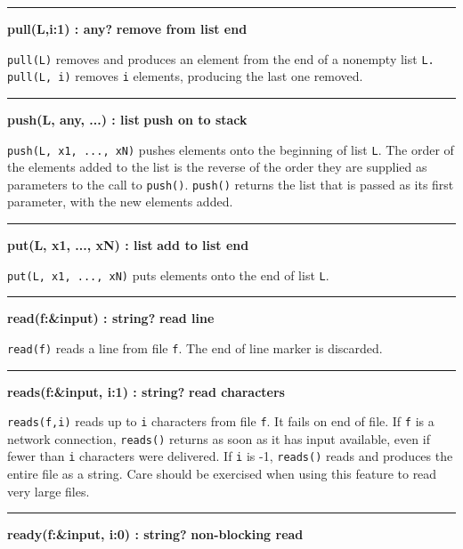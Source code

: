 \bigskip\hrule\vspace{0.1cm}
\noindent
{\bf pull(L,i:1) : any? } \hfill {\bf remove from list end}\WarningNotThreadSafe

\noindent
{}\texttt{pull(L)} removes and produces an element from the
end of a nonempty list \texttt{L.} \texttt{pull(L, i)} removes
\texttt{i} elements, producing the last one removed.

\bigskip\hrule\vspace{0.1cm}
\noindent
{\bf push(L, any, ...) : list } \hfill {\bf push on to stack}\WarningNotThreadSafe

\noindent
\texttt{push(L, x1, ..., xN)} pushes elements onto the beginning of list
\texttt{L}. The order of the elements added to the list is the reverse
of the order they are supplied as parameters to the call to
\texttt{push()}. \texttt{push()} returns the list that is
passed as its first parameter, with the new elements added.

\hrule\vspace{0.1cm}
\noindent
{\bf put(L, x1, ..., xN) : list } \hfill {\bf add to list end}\WarningNotThreadSafe

\noindent
{}\texttt{put(L, x1, ..., xN)} puts elements onto the end of
list \texttt{L}.

\bigskip\hrule\vspace{0.1cm}
\noindent
{\bf read(f:\&input) : string? } \hfill {\bf read line}

\noindent
{}\texttt{read(f)} reads a line from file \texttt{f}. The
end of line marker is discarded.

\bigskip\hrule\vspace{0.1cm}
\noindent
{\bf reads(f:\&input, i:1) : string? } \hfill {\bf read characters}

\noindent
{}\texttt{reads(f,i)} reads up to \texttt{i} characters
from file \texttt{f}. It fails on end of file. If \texttt{f} is a
network connection, \texttt{reads()} returns as soon as it has input
available, even if fewer than \texttt{i} characters were delivered. If
\texttt{i} is -1, \texttt{reads()} reads and produces the entire file
as a string. Care should be exercised when using this feature to read
very large files.

\bigskip\hrule\vspace{0.1cm}
\noindent
{\bf ready(f:\&input, i:0) : string? } \hfill {\bf non{}-blocking read}

